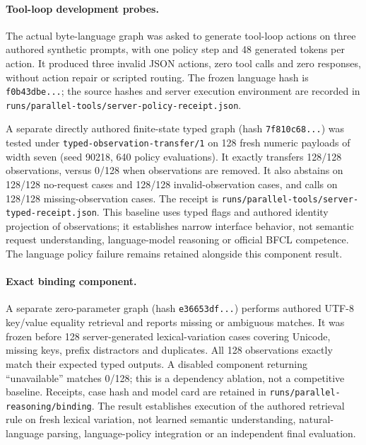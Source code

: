 \documentclass[11pt]{article}
\begin{document}
\paragraph{Tool-loop development probes.}
The actual byte-language graph was asked to generate tool-loop actions on three
authored synthetic prompts, with one policy step and 48 generated tokens per
action. It produced three invalid JSON actions, zero tool calls and zero
responses, without action repair or scripted routing. The frozen language hash
is \texttt{f0b43dbe...}; the source hashes and server execution environment are
recorded in \texttt{runs/parallel-tools/server-policy-receipt.json}.

A separate directly authored finite-state typed graph
(hash \texttt{7f810c68...}) was tested under
\texttt{typed-observation-transfer/1} on 128 fresh numeric payloads of width
seven (seed 90218, 640 policy evaluations). It exactly transfers 128/128
observations, versus 0/128 when observations are removed. It also abstains on
128/128 no-request cases and 128/128 invalid-observation cases, and calls on
128/128 missing-observation cases. The receipt is
\texttt{runs/parallel-tools/server-typed-receipt.json}. This baseline uses
typed flags and authored identity projection of observations; it establishes
narrow interface behavior, not semantic request understanding, language-model
reasoning or official BFCL competence. The language policy failure remains
retained alongside this component result.

\paragraph{Exact binding component.}
A separate zero-parameter graph (hash \texttt{e36653df...}) performs authored
UTF-8 key/value equality retrieval and reports missing or ambiguous matches.
It was frozen before 128 server-generated lexical-variation cases covering
Unicode, missing keys, prefix distractors and duplicates. All 128 observations
exactly match their expected typed outputs. A disabled component returning
``unavailable'' matches 0/128; this is a dependency ablation, not a competitive
baseline. Receipts, case hash and model card are retained in
\texttt{runs/parallel-reasoning/binding}. The result establishes execution of
the authored retrieval rule on fresh lexical variation, not learned semantic
understanding, natural-language parsing, language-policy integration or an
independent final evaluation.
\end{document}
